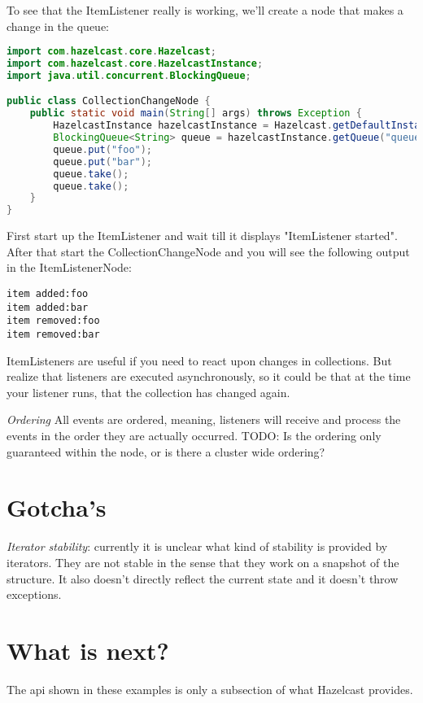 To see that the ItemListener really is working, we'll create a node that makes a change in the queue:
\begin{lstlisting}[language=java]
import com.hazelcast.core.Hazelcast;
import com.hazelcast.core.HazelcastInstance;
import java.util.concurrent.BlockingQueue;

public class CollectionChangeNode {
    public static void main(String[] args) throws Exception {
        HazelcastInstance hazelcastInstance = Hazelcast.getDefaultInstance();
        BlockingQueue<String> queue = hazelcastInstance.getQueue("queue");
        queue.put("foo");
        queue.put("bar");
        queue.take();
        queue.take();
    }
}
\end{lstlisting}

First start up the ItemListener and wait till it displays "ItemListener started". After that start the CollectionChangeNode and you will see the following output in the ItemListenerNode:
\begin{verbatim}
item added:foo
item added:bar
item removed:foo
item removed:bar
\end{verbatim}

ItemListeners are useful if you need to react upon changes in collections. But realize that listeners are executed asynchronously, so it could be that at the time your listener runs, that the collection has changed again. 

\emph{Ordering} All events are ordered, meaning, listeners will receive and process the events in the order they are actually occurred. TODO: Is the ordering only guaranteed within the node, or is there a cluster wide ordering?

\section{Gotcha's}
\emph{Iterator stability}: currently it is unclear what kind of stability is provided by iterators. They are not stable in the sense that they work on a snapshot of the structure. It also doesn't directly reflect the current state and it doesn't throw exceptions.

\section{What is next?}
The api shown in these examples is only a subsection of what Hazelcast provides.